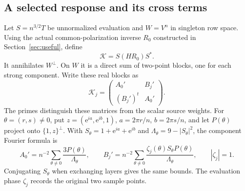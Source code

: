 \documentclass[11pt]{article}
\newcommand{\e}{\mathrm e}
\theoremstyle{definition}
\theoremstyle{remark}
\begin{document}
\subsection{A selected response and its cross terms}
Let $S=n^{3/2}T$ be unnormalized evaluation and $W=V^n$ in singleton
row space. Using the actual common-polarization inverse $R_0$ constructed
in Section~\ref{sec:useful}, define
\[
                 \mathcal K=S(HR_0)S^*.
\]
It annihilates $W^\perp$. On $W$ it is a direct sum of two-point blocks,
one for each strong component. Write these real blocks as
\[
 \mathcal K_j=\begin{pmatrix} A_0'&B_j'\\(B_j')^t&A_0'\end{pmatrix}.
\]
The primes distinguish these matrices from the scalar source weights.
For $\theta=(r,s)\ne0$, put $z=(\e^{ia},\e^{ib},1)$,
$a=2\pi r/n$, $b=2\pi s/n$, and let $P(\theta)$ project onto
$\{1,z\}^\perp$. With $S_\theta=1+\e^{ia}+\e^{ib}$ and
$\Lambda_\theta=9-|S_\theta|^2$, the component Fourier formula is
\[
 A_0'=n^{-2}\sum_{\theta\ne0}\frac{3P(\theta)}{\Lambda_\theta},
 \qquad
 B_j'=n^{-2}\sum_{\theta\ne0}
        \frac{\zeta_j(\theta)S_\theta P(\theta)}{\Lambda_\theta},
 \qquad |\zeta_j|=1.
\]
Conjugating $S_\theta$ when exchanging layers gives the same bounds.
The evaluation phase $\zeta_j$ records the original two sample points.
\end{document}
